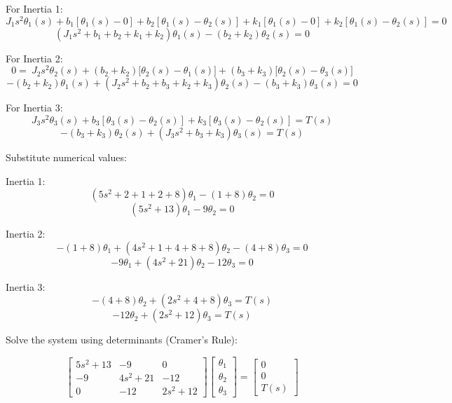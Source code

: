 \begin{figure}[!ht]
\end{figure}

For Inertia 1:
\[
J_1 s^2 \theta_1(s) + b_1 \left[\theta_1(s) - 0\right] + b_2 \left[\theta_1(s) - \theta_2(s)\right] + k_1 \left[\theta_1(s) - 0\right] + k_2 \left[\theta_1(s) - \theta_2(s)\right] = 0
\]
\[
( J_1 s^2 + b_1 + b_2 + k_1 + k_2 ) \theta_1(s) - (b_2 + k_2) \theta_2(s) = 0
\]

For Inertia 2:
\[
0 =\ J_2 s^2 \theta_2(s) 
    + (b_2 + k_2)\big[\theta_2(s) - \theta_1(s)\big] 
    + (b_3 + k_3)\big[\theta_2(s) - \theta_3(s)\big]
\]
\[
-(b_2 + k_2)\theta_1(s) 
+ (J_2 s^2 + b_2 + b_3 + k_2 + k_3)\theta_2(s) 
- (b_3 + k_3) \theta_3(s) 
= 0
\]

For Inertia 3:
\[
J_3 s^2 \theta_3(s) + b_3 \left[\theta_3(s) - \theta_2(s)\right] + k_3 \left[\theta_3(s) - \theta_2(s)\right] = T(s)
\]
\[
-(b_3 + k_3)\theta_2(s) + (J_3 s^2 + b_3 + k_3) \theta_3(s) = T(s)
\]

Substitute numerical values:

Inertia 1:
\[
(5 s^2 + 2 + 1 + 2 + 8) \theta_1 - (1 + 8) \theta_2 = 0
\]
\[
(5 s^2 + 13)\theta_1 - 9 \theta_2 = 0
\]

Inertia 2:
\[
-(1+8)\theta_1 + (4 s^2 + 1 + 4 + 8 + 8)\theta_2 - (4+8)\theta_3 = 0
\]
\[
-9 \theta_1 + (4 s^2 + 21)\theta_2 - 12 \theta_3 = 0
\]

Inertia 3:
\[
-(4+8)\theta_2 + (2 s^2 + 4 + 8)\theta_3 = T(s)
\]
\[
-12 \theta_2 + (2 s^2 + 12) \theta_3 = T(s)
\]

Solve the system using determinants (Cramer's Rule):

\[
\begin{bmatrix}
5s^2 + 13 & -9 & 0 \\
-9 & 4s^2 + 21 & -12 \\
0 & -12 & 2s^2 + 12
\end{bmatrix}
\begin{bmatrix}
\theta_1 \\ \theta_2 \\ \theta_3
\end{bmatrix}
=
\begin{bmatrix}
0 \\ 0 \\ T(s)
\end{bmatrix}
\]

